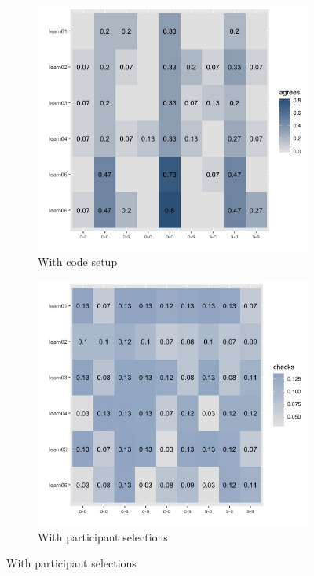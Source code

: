 \documentclass{article}
\begin{document}
\begin{figure}[h!]
  \centering
  \begin{subfigure}[t]{0.45\textwidth}
    \centering
    \includegraphics[width=\linewidth]{nine_theories_w_codenorm} 
    \caption{With code setup}
  \end{subfigure}
  \hfill
  \begin{subfigure}[t]{0.45\textwidth}
    \centering
    \includegraphics[width=\linewidth]{nine_theories_w_ppt} 
    \caption{With participant selections}
  \end{subfigure}
  \label{fig:theory_comp}
\end{figure}
\end{document}
